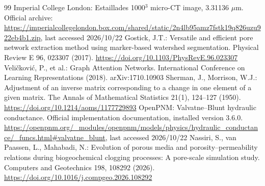 \documentclass[a4paper]{svproc}
\begin{document}
\begin{thebibliography}{99}
 Imperial College London: Estaillades 1000\ensuremath{^{3}} micro-CT image, 3.31136 \ensuremath{\mu}m. Official archive: \url{https://imperialcollegelondon.box.com/shared/static/2n4lb95amz7fstk19q826uzu922eb4b1.zip}, last accessed 2026/10/22
 Gostick, J.T.: Versatile and efficient pore network extraction method using marker-based watershed segmentation. Physical Review E 96, 023307 (2017). \url{https://doi.org/10.1103/PhysRevE.96.023307}
 Veličković, P., et al.: Graph Attention Networks. International Conference on Learning Representations (2018). arXiv:1710.10903
 Sherman, J., Morrison, W.J.: Adjustment of an inverse matrix corresponding to a change in one element of a given matrix. The Annals of Mathematical Statistics 21(1), 124--127 (1950). \url{https://doi.org/10.1214/aoms/1177729893}
 OpenPNM: Valvatne--Blunt hydraulic conductance. Official implementation documentation, installed version 3.6.0. \url{https://openpnm.org/_modules/openpnm/models/physics/hydraulic_conductance/_funcs.html#valvatne_blunt}, last accessed 2026/10/22
 Nassiri, S., van Paassen, L., Mahabadi, N.: Evolution of porous media and porosity--permeability relations during biogeochemical clogging processes: A pore-scale simulation study. Computers and Geotechnics 198, 108292 (2026). \url{https://doi.org/10.1016/j.compgeo.2026.108292}
\end{thebibliography}
\end{document}

